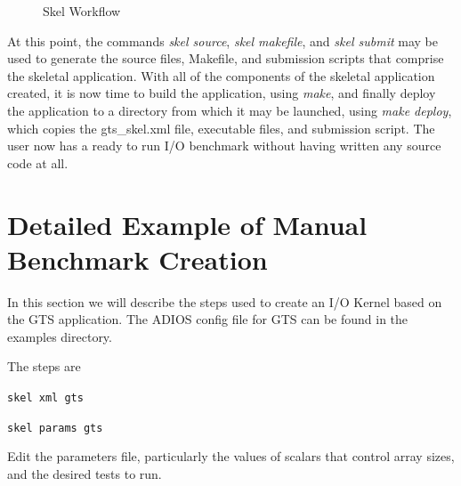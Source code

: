 \begin{figure}[htb]
  \caption{\label{fig:overview} Skel Workflow}
\end{figure}


At this point, the commands {\it skel source}, {\it skel makefile}, and {\it skel submit}
may be used to generate the source files, Makefile, and submission scripts that
comprise the skeletal application. With all of the components of the skeletal
application created, it is now time to build the application, using {\it make}, and
finally deploy the application to a directory from which it may be launched,
using {\it make deploy}, which copies the gts\_skel.xml file, executable files, and
submission script. The user now has a ready to run I/O benchmark without
having written any source code at all.



\section{Detailed Example of Manual Benchmark Creation}
In this section we will describe the steps used to create an I/O Kernel based
on the GTS application. The ADIOS config file for GTS can be found in the
examples directory.

The steps are

{\tt skel xml gts}

{\tt skel params gts}

Edit the parameters file, particularly the values of scalars that control array sizes,
and the desired tests to run.

